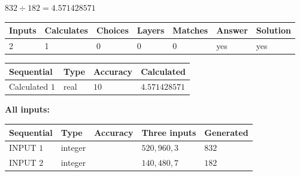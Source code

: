 \documentclass{ctexart}
\begin{document}
 

 
 
 
\noindent{}
 
 

$ %
832 \div  %
182=   %
4.571428571$
 
 
\noindent{}
 
 

 
   
   
   
   
\noindent\begin{tabular}{|l|l|l|l|l|l|l|}
 \hline
Inputs & Calculates & Choices & Layers & Matches & Answer & Solution \\ \hline
 2  & 
 1  & 
 0
  & 
 0  & 
 0  & 
  yes & 
  yes 
  \\ \hline
 \end{tabular}
   
   
   
   
\noindent{}
   
   
  
  
\noindent\begin{tabular}{|l|l|l|l|}
\hline
 Sequential & Type & Accuracy & Calculated \\ 
\hline
 
 
  Calculated $  1 $ & real & $  10  $ & 
 $ 4.571428571 $ 
 \\  \hline  
 \end{tabular}
   
   
   
   
\noindent\vspace{0.1in}\hspace{-0.08in} {\textbf{\Large{All inputs: }}}
   
   
  
  
\noindent\begin{tabular}{|l|l|l|l|l|}
\hline
 Sequential & Type & Accuracy & Three inputs & Generated \\ 
\hline
 
 
  INPUT $  1 $ & integer &  & $
 520
 , 
 960
 , 
 3
 $ & $ 832 $ 
 \\  \hline  
 
 
  INPUT $  2 $ & integer &  & $
 140
 , 
 480
 , 
 7
 $ & $ 182 $ 
 \\  \hline  
 \end{tabular}
   
\end{document}
